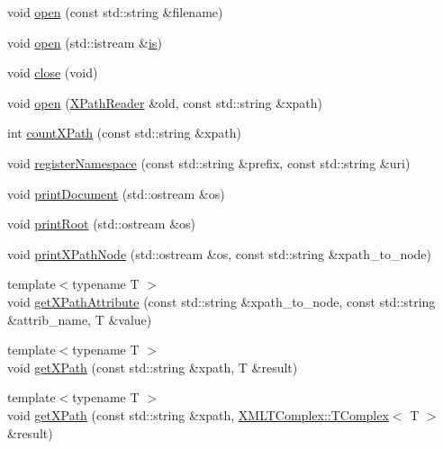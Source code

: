 \begin{DoxyCompactItemize}
\item 
void \mbox{\hyperlink{classXMLXPathReader_1_1XPathReader_aa6e237582bcd20389d60cb29a879890c}{open}} (const std\+::string \&filename)
\item 
void \mbox{\hyperlink{classXMLXPathReader_1_1XPathReader_aa9a57010ee8e71ac43da4388d622fe32}{open}} (std\+::istream \&\mbox{\hyperlink{x_8cc_a81abbbdef81e25584a2eab888e643d3d}{is}})
\item 
void \mbox{\hyperlink{classXMLXPathReader_1_1XPathReader_a2b6cfab8c9771da838a2bca6c9f23cb9}{close}} (void)
\item 
void \mbox{\hyperlink{classXMLXPathReader_1_1XPathReader_a55e38b40f720bb3622e3489561b1457c}{open}} (\mbox{\hyperlink{classXMLXPathReader_1_1XPathReader}{X\+Path\+Reader}} \&old, const std\+::string \&xpath)
\item 
int \mbox{\hyperlink{classXMLXPathReader_1_1XPathReader_a9fd76703ea5321a4666ca9a0c07a222a}{count\+X\+Path}} (const std\+::string \&xpath)
\item 
void \mbox{\hyperlink{classXMLXPathReader_1_1XPathReader_a4df21ae718977be11eb5669002522ebb}{register\+Namespace}} (const std\+::string \&prefix, const std\+::string \&uri)
\item 
void \mbox{\hyperlink{classXMLXPathReader_1_1XPathReader_a5505bd1ad902828907e2562947719fef}{print\+Document}} (std\+::ostream \&os)
\item 
void \mbox{\hyperlink{classXMLXPathReader_1_1XPathReader_a9634a8955fc1b2c8bc086b95f7fa2c1f}{print\+Root}} (std\+::ostream \&os)
\item 
void \mbox{\hyperlink{classXMLXPathReader_1_1XPathReader_a8f751fb071319179252a48075239559c}{print\+X\+Path\+Node}} (std\+::ostream \&os, const std\+::string \&xpath\+\_\+to\+\_\+node)
\item 
{\footnotesize template$<$typename T $>$ }\\void \mbox{\hyperlink{classXMLXPathReader_1_1XPathReader_a0a5ca67826c2c8fdad784a3bbbba4b3c}{get\+X\+Path\+Attribute}} (const std\+::string \&xpath\+\_\+to\+\_\+node, const std\+::string \&attrib\+\_\+name, T \&value)
\item 
{\footnotesize template$<$typename T $>$ }\\void \mbox{\hyperlink{classXMLXPathReader_1_1XPathReader_abbd673bc00e75502126b2cca246ff6f4}{get\+X\+Path}} (const std\+::string \&xpath, T \&result)
\item 
{\footnotesize template$<$typename T $>$ }\\void \mbox{\hyperlink{classXMLXPathReader_1_1XPathReader_a82579390a7b37879a7a7d9b79934a592}{get\+X\+Path}} (const std\+::string \&xpath, \mbox{\hyperlink{classXMLTComplex_1_1TComplex}{X\+M\+L\+T\+Complex\+::\+T\+Complex}}$<$ T $>$ \&result)

\end{DoxyCompactItemize}
